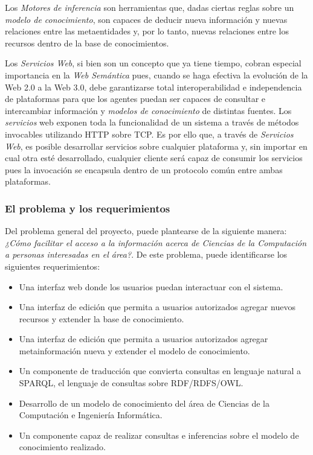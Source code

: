 Los \textit{Motores de inferencia} son herramientas que, dadas ciertas reglas sobre un \textit{modelo de conocimiento}, son capaces de deducir nueva información y nuevas relaciones entre las metaentidades y, por lo tanto, nuevas relaciones entre los recursos dentro de la base de conocimientos.

Los \textit{Servicios Web}, si bien son un concepto que ya tiene tiempo, cobran especial importancia en la \textit{Web Semántica} pues, cuando se haga efectiva la evolución de la Web 2.0 a la Web 3.0, debe garantizarse total interoperabilidad e independencia de plataformas para que los agentes puedan ser capaces de consultar e intercambiar información y \textit{modelos de conocimiento} de distintas fuentes. Los \textit{servicios} web exponen toda la funcionalidad de un sistema a través de métodos invocables utilizando HTTP sobre TCP. Es por ello que, a través de \textit{Servicios Web}, es posible desarrollar servicios sobre cualquier plataforma y, sin importar en cual otra esté desarrollado, cualquier cliente será capaz de consumir los servicios pues la invocación se encapsula dentro de un protocolo común entre ambas plataformas.

\subsubsection{El problema y los requerimientos}
Del problema general del proyecto, puede plantearse de la siguiente manera: \textit{¿Cómo facilitar el acceso a la información acerca de Ciencias de la Computación a personas interesadas en el área?}. De este problema, puede identificarse los siguientes requerimientos:

\begin{itemize}
\item Una interfaz web donde los usuarios puedan interactuar con el sistema.
\item Una interfaz de edición que permita a usuarios autorizados agregar nuevos recursos y extender la base de conocimiento.
\item Una interfaz de edición que permita a usuarios autorizados agregar metainformación nueva y extender el modelo de conocimiento.
\item Un componente de traducción que convierta consultas en lenguaje natural a SPARQL, el lenguaje de consultas sobre RDF/RDFS/OWL.
\item Desarrollo de un modelo de conocimiento del área de Ciencias de la Computación e Ingeniería Informática.
\item Un componente capaz de realizar consultas e inferencias sobre el modelo de conocimiento realizado.
\end{itemize}

